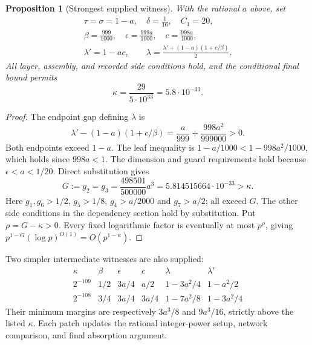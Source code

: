 \documentclass[11pt]{article}
\newtheorem{proposition}{Proposition}
\begin{document}
\begin{proposition}[Strongest supplied witness]
With the rational $a$ above, set
\begin{gather*}
 \tau=\sigma=1-a,\quad \delta=\tfrac1{16},\quad C_1=20,\\
 \beta=\frac{999}{1000},\quad
 \epsilon=\frac{999a}{1000},\quad c=\frac{998a}{1000},\\
 \lambda'=1-ac,\qquad
 \lambda=\frac{\lambda'+(1-a)(1+c/\beta)}2.
\end{gather*}
All layer, assembly, and recorded side conditions hold, and the
conditional final bound permits
\[
 \boxed{\kappa=\frac{29}{5\cdot10^{33}}=5.8\cdot10^{-33}}.
\]
\end{proposition}
\begin{proof}
The endpoint gap defining $\lambda$ is
\[
 \lambda'-(1-a)(1+c/\beta)
 =\frac{a}{999}+\frac{998a^2}{999000}>0.
\]
Both endpoints exceed $1-a$. The leaf inequality is
$1-a/1000<1-998a^2/1000$, which holds since $998a<1$.
The dimension and guard requirements hold because $\epsilon<a<1/20$.
Direct substitution gives
\[
 G:=g_2=g_3=\frac{498501}{500000}a^3
   =5.814515664\cdot10^{-33}>\kappa.
\]
Here $g_1,g_6>1/2$, $g_5>1/8$, $g_4>a/2000$ and $g_7>a/2$;
all exceed $G$. The other side conditions in the dependency section hold
by substitution. Put $\rho=G-\kappa>0$. Every fixed logarithmic factor
is eventually at most $p^\rho$, giving
$p^{1-G}(\log p)^{O(1)}=O(p^{1-\kappa})$.
\end{proof}

Two simpler intermediate witnesses are also supplied:
\[
\begin{array}{c|c|c|c|c|c}
\kappa&\beta&\epsilon&c&\lambda&\lambda'\\\hline
2^{-109}&1/2&3a/4&a/2&1-3a^2/4&1-a^2/2\\
2^{-108}&3/4&3a/4&3a/4&1-7a^2/8&1-3a^2/4
\end{array}
\]
Their minimum margins are respectively $3a^3/8$ and $9a^3/16$,
strictly above the listed $\kappa$. Each patch updates the rational
integer-power setup, network comparison, and final absorption argument.
\end{document}
